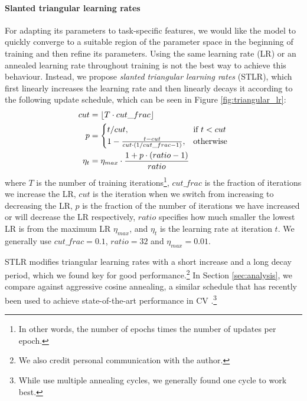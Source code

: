 \documentclass[11pt,a4paper]{article}
\DeclarePairedDelimiter\floor{\lfloor}{\rfloor}
\begin{document}
\paragraph{Slanted triangular learning rates} For adapting its parameters to task-specific features, we would like the model to quickly converge to a suitable region of the parameter space in the beginning of training and then refine its parameters. Using the same learning rate (LR) or an annealed learning rate throughout training is not the best way to achieve this behaviour. 
Instead, we propose \emph{slanted triangular learning rates} (STLR), which first linearly increases the learning rate and then linearly decays it according to the following update schedule, which can be seen in Figure \ref{fig:triangular_lr}:
\begin{equation}
\begin{split}
  cut & = \floor{T \cdot cut\_frac} \\
  p & =
  \begin{cases}
      t/cut, & \text{if}\ t < cut \\
      1 - \frac{t-cut}{cut \cdot (1/cut\_frac - 1)}, & \text{otherwise}
  \end{cases}\\
  \eta_t & = \eta_{max} \cdot \frac{1 + p \cdot (ratio - 1)}{ratio}
\end{split}
\end{equation}
where $T$ is the number of training iterations\footnote{In other words, the number of epochs times the number of updates per epoch.}, $cut\_frac$ is the fraction of iterations we increase the LR, $cut$ is the iteration when we switch from increasing to decreasing the LR, $p$ is the fraction of the number of iterations we have increased or will decrease the LR respectively, $ratio$ specifies how much smaller the lowest LR is from the maximum LR $\eta_{max}$, and $\eta_t$ is the learning rate at iteration $t$. We generally use $cut\_frac=0.1$, $ratio=32$ and $\eta_{max} = 0.01$.

STLR modifies triangular learning rates \cite{smith2017cyclical} with a short increase and a long decay period, which we found key for good performance.\footnote{We also credit personal communication with the author.} In Section \ref{sec:analysis}, we compare against aggressive cosine annealing, a similar schedule that has recently been used to achieve state-of-the-art performance in CV \cite{Loshchilov2017}.\footnote{While \citet{Loshchilov2017} use multiple annealing cycles, we generally found one cycle to work best.}
\end{document}
